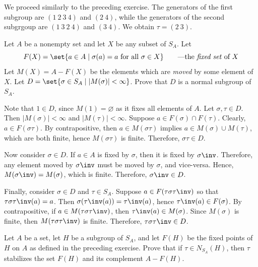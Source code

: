 \begin{sol}
	We proceed similarly to the preceding exercise. The generators of the first subgroup are $(1\ 2\ 3\ 4)$ and $(2\ 4)$, while the generators of the second subgrgoup are $(1\ 3\ 2\ 4)$ and $(3\ 4)$. We obtain $\tau = (2\ 3)$.
\end{sol}

\begin{specialexercise}\label{ex4.3.17}
	Let $A$ be a nonempty set and let $X$ be any subset of $S_A$. Let
	\[F(X) = \set{a \in A \mid \sigma(a) = a \text{ for all } \sigma \in X} \qquad \text{---the \emph{fixed set} of $X$}\]
	Let $M(X) = A - F(X)$ be the elements which are \emph{moved} by some element of $X$. Let $D = \set{\sigma \in S_A \mid |M(\sigma)| < \infty}$. Prove that $D$ is a normal subgroup of $S_A$.
\end{specialexercise}

\begin{sol}
	Note that $1 \in D$, since $M(1) = \varnothing$ as it fixes all elements of $A$. Let $\sigma, \tau \in D$. Then $|M(\sigma)| < \infty$ and $|M(\tau)| < \infty$. Suppose $a \in F(\sigma) \cap F(\tau)$. Clearly, $a \in F(\sigma\tau)$. By contrapositive, then $a \in M(\sigma\tau)$ implies $a \in M(\sigma) \cup M(\tau)$, which are both finite, hence $M(\sigma\tau)$ is finite. Therefore, $\sigma\tau \in D$.
	
	Now consider $\sigma \in D$. If $a \in A$ is fixed by $\sigma$, then it is fixed by $\sigma\inv$. Therefore, any element moved by $\sigma\inv$ must be moved by $\sigma$, and vice-versa. Hence, $M(\sigma\inv) = M(\sigma)$, which is finite. Therefore, $\sigma\inv \in D$.

	Finally, consider $\sigma \in D$ and $\tau \in S_A$. Suppose $a \in F(\tau\sigma\tau\inv)$ so that $\tau\sigma\tau\inv(a) = a$. Then $\sigma(\tau\inv(a)) = \tau\inv(a)$, hence $\tau\inv(a) \in F(\sigma)$. By contrapositive, if $a \in M(\tau\sigma\tau\inv)$, then $\tau\inv(a) \in M(\sigma)$. Since $M(\sigma)$ is finite, then $M(\tau\sigma\tau\inv)$ is finite. Therefore, $\tau\sigma\tau\inv \in D$.
\end{sol}

\begin{exercise}
	Let $A$ be a set, let $H$ be a subgroup of $S_A$, and let $F(H)$ be the fixed points of $H$ on $A$ as defined in the preceding exercise. Prove that if $\tau \in N_{S_A}(H)$, then $\tau$ stabilizes the set $F(H)$ and its complement $A - F(H)$.
\end{exercise}


